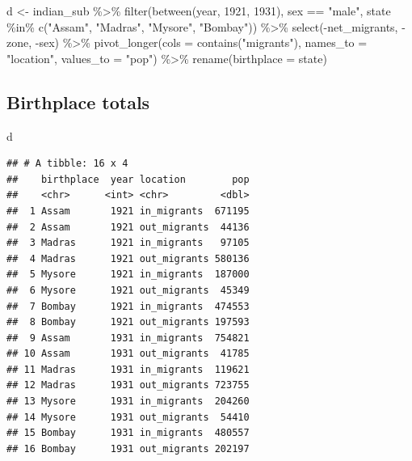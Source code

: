 \documentclass[
]{book}
\newenvironment{Shaded}{\begin{snugshade}}{\end{snugshade}}
\newcommand{\AttributeTok}[1]{\textcolor[rgb]{0.77,0.63,0.00}{#1}}
\newcommand{\DecValTok}[1]{\textcolor[rgb]{0.00,0.00,0.81}{#1}}
\newcommand{\FunctionTok}[1]{\textcolor[rgb]{0.00,0.00,0.00}{#1}}
\newcommand{\NormalTok}[1]{#1}
\newcommand{\OtherTok}[1]{\textcolor[rgb]{0.56,0.35,0.01}{#1}}
\newcommand{\SpecialCharTok}[1]{\textcolor[rgb]{0.00,0.00,0.00}{#1}}
\newcommand{\StringTok}[1]{\textcolor[rgb]{0.31,0.60,0.02}{#1}}
\begin{document}
\begin{Shaded}
\begin{Highlighting}[]
\NormalTok{d }\OtherTok{\textless{}{-}}\NormalTok{ indian\_sub }\SpecialCharTok{\%\textgreater{}\%}
  \FunctionTok{filter}\NormalTok{(}\FunctionTok{between}\NormalTok{(year, }\DecValTok{1921}\NormalTok{, }\DecValTok{1931}\NormalTok{),}
\NormalTok{                 sex }\SpecialCharTok{==} \StringTok{"male"}\NormalTok{,}
\NormalTok{                 state }\SpecialCharTok{\%in\%} \FunctionTok{c}\NormalTok{(}\StringTok{"Assam"}\NormalTok{, }\StringTok{"Madras"}\NormalTok{, }\StringTok{"Mysore"}\NormalTok{, }\StringTok{"Bombay"}\NormalTok{)) }\SpecialCharTok{\%\textgreater{}\%}
  \FunctionTok{select}\NormalTok{(}\SpecialCharTok{{-}}\NormalTok{net\_migrants, }\SpecialCharTok{{-}}\NormalTok{zone, }\SpecialCharTok{{-}}\NormalTok{sex) }\SpecialCharTok{\%\textgreater{}\%}
  \FunctionTok{pivot\_longer}\NormalTok{(}\AttributeTok{cols =} \FunctionTok{contains}\NormalTok{(}\StringTok{"migrants"}\NormalTok{), }\AttributeTok{names\_to =}  \StringTok{"location"}\NormalTok{,}
               \AttributeTok{values\_to =} \StringTok{"pop"}\NormalTok{) }\SpecialCharTok{\%\textgreater{}\%}
  \FunctionTok{rename}\NormalTok{(}\AttributeTok{birthplace =}\NormalTok{ state)}
\end{Highlighting}
\end{Shaded}

\hypertarget{birthplace-totals-2}{%
\subsection{Birthplace totals}\label{birthplace-totals-2}}

\begin{Shaded}
\begin{Highlighting}[]
\NormalTok{d}
\end{Highlighting}
\end{Shaded}

\begin{verbatim}
## # A tibble: 16 x 4
##    birthplace  year location        pop
##    <chr>      <int> <chr>         <dbl>
##  1 Assam       1921 in_migrants  671195
##  2 Assam       1921 out_migrants  44136
##  3 Madras      1921 in_migrants   97105
##  4 Madras      1921 out_migrants 580136
##  5 Mysore      1921 in_migrants  187000
##  6 Mysore      1921 out_migrants  45349
##  7 Bombay      1921 in_migrants  474553
##  8 Bombay      1921 out_migrants 197593
##  9 Assam       1931 in_migrants  754821
## 10 Assam       1931 out_migrants  41785
## 11 Madras      1931 in_migrants  119621
## 12 Madras      1931 out_migrants 723755
## 13 Mysore      1931 in_migrants  204260
## 14 Mysore      1931 out_migrants  54410
## 15 Bombay      1931 in_migrants  480557
## 16 Bombay      1931 out_migrants 202197
\end{verbatim}
\end{document}
